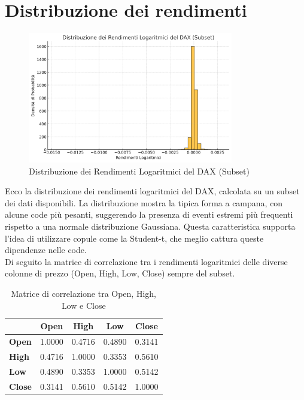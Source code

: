 \documentclass[%
	corpo=11pt,
    twoside,
    stile=classica,
    oldstyle,
    tipotesi=custom,
    greek,
    evenboxes,
]{toptesi}
\begin{document}
\section{Distribuzione dei rendimenti}

\begin{figure}[h]
	\centering
	\includegraphics[width=0.8\textwidth]{./Pictures/rendimenti.png}
	\caption{Distribuzione dei Rendimenti Logaritmici del DAX (Subset)}
	\label{fig:log_returns_distribution}
\end{figure}

Ecco la distribuzione dei rendimenti logaritmici del DAX, calcolata su un subset dei dati disponibili. La distribuzione mostra la tipica forma a campana, con alcune code più pesanti, suggerendo la presenza di eventi estremi più frequenti rispetto a una normale distribuzione Gaussiana. Questa caratteristica supporta l’idea di utilizzare copule come la Student-t, che meglio cattura queste dipendenze nelle code.\\


Di seguito la matrice di correlazione tra i rendimenti logaritmici delle diverse colonne di prezzo (Open, High, Low, Close) sempre del subset.

\begin{table}[h]
	\centering
	\renewcommand{\arraystretch}{1.2} %
	\setlength{\tabcolsep}{8pt} %
	\small %
	\begin{tabular}{lcccc} %
		\toprule
		& \textbf{Open} & \textbf{High} & \textbf{Low} & \textbf{Close} \\
		\midrule
		\textbf{Open}  & 1.0000  & 0.4716  & 0.4890  & 0.3141  \\
		\textbf{High}  & 0.4716  & 1.0000  & 0.3353  & 0.5610  \\
		\textbf{Low}   & 0.4890  & 0.3353  & 1.0000  & 0.5142  \\
		\textbf{Close} & 0.3141  & 0.5610  & 0.5142  & 1.0000  \\
		\bottomrule
	\end{tabular}
	\caption{Matrice di correlazione tra Open, High, Low e Close}
	\label{tab:matrice_correlazione}
\end{table}
\end{document}
